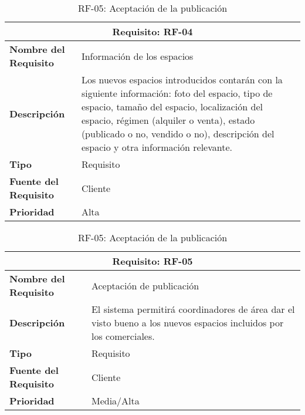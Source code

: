 \begin{table}[H]
\begin{table}[H]
\begin{center}
\begin{tabular}{p{} p{7cm}}
\multicolumn{2}{c}{\textbf{Requisito: RF-04} } \\
\hline \hline
\textbf{Nombre del Requisito} & Información de los espacios \\
\hline
\textbf{Descripción} & Los nuevos espacios introducidos contarán con la siguiente información: foto del espacio, tipo de espacio, tamaño del espacio, localización del espacio, régimen (alquiler o venta), estado (publicado o no, vendido o no), descripción del espacio y otra información relevante.\\
\hline
\textbf{Tipo} & Requisito  \\
\hline
\textbf{Fuente del Requisito} & Cliente \\
\hline
\textbf{Prioridad} &  Alta \\ \hline
\end{tabular}
\caption{RF-04: Información de los espacios}
\label{tab:RF-04}
\end{center}
\end{table}

\begin{table}[H]
\begin{center}
\begin{tabular}{p{} p{7cm}}
\multicolumn{2}{c}{\textbf{Requisito: RF-05} } \\
\hline \hline
\textbf{Nombre del Requisito} & Aceptación de publicación  \\
\hline
\textbf{Descripción} & El sistema permitirá coordinadores de área dar el visto bueno a los nuevos espacios incluidos por los comerciales. \\
\hline
\textbf{Tipo} & Requisito  \\
\hline
\textbf{Fuente del Requisito} & Cliente  \\
\hline
\textbf{Prioridad} &  Media/Alta \\ \hline
\end{tabular}
\caption{RF-05: Aceptación de la publicación}
\label{tab:RF-05}
\end{center}
\end{table}


\end{table}
